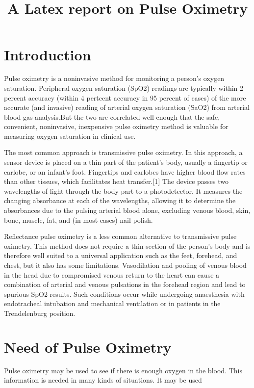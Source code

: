 \documentclass[12pt]{article}
\begin{document}
\title{A Latex report on Pulse Oximetry}
\maketitle{}

\section{Introduction}
Pulse oximetry is a noninvasive method for monitoring a person's oxygen saturation. Peripheral oxygen saturation (SpO2) readings are typically within 2 percent accuracy (within 4 pertcent accuracy in 95 percent of cases) of the more accurate (and invasive) reading of arterial oxygen saturation (SaO2) from arterial blood gas analysis.But the two are correlated well enough that the safe, convenient, noninvasive, inexpensive pulse oximetry method is valuable for measuring oxygen saturation in clinical use.

The most common approach is transmissive pulse oximetry. In this approach, a sensor device is placed on a thin part of the patient's body, usually a fingertip or earlobe, or an infant's foot. Fingertips and earlobes have higher blood flow rates than other tissues, which facilitates heat transfer.[1] The device passes two wavelengths of light through the body part to a photodetector. It measures the changing absorbance at each of the wavelengths, allowing it to determine the absorbances due to the pulsing arterial blood alone, excluding venous blood, skin, bone, muscle, fat, and (in most cases) nail polish.

Reflectance pulse oximetry is a less common alternative to transmissive pulse oximetry. This method does not require a thin section of the person's body and is therefore well suited to a universal application such as the feet, forehead, and chest, but it also has some limitations. Vasodilation and pooling of venous blood in the head due to compromised venous return to the heart can cause a combination of arterial and venous pulsations in the forehead region and lead to spurious SpO2 results. Such conditions occur while undergoing anaesthesia with endotracheal intubation and mechanical ventilation or in patients in the Trendelenburg position.


\section{Need of Pulse Oximetry}
Pulse oximetry may be used to see if there is enough oxygen in the blood. This information is needed in many kinds of situations. It may be used
\end{document}
